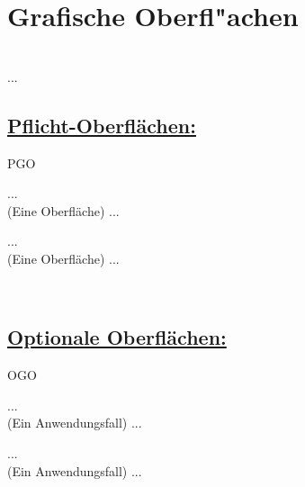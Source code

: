 %
%


%
%
\clearpage


\section{Grafische Oberfl{"a}chen}
\label{NU:GO}~\\

...
\\


\subsection*{\underline{Pflicht-Oberflächen:}}

\begin{ids}{\gls{PGO}}

	\id[ 1] ... \hfill\\
	
	(Eine Oberfläche) ...
	
	\id[10] ... \hfill\\
	
	(Eine Oberfläche) ...

\end{ids}


~\\


\subsection*{\underline{Optionale Oberflächen:}}

\begin{ids}{\gls{OGO}}

	\id[ 1] ... \hfill\\
	
	(Ein Anwendungsfall) ...
	
	\id[10] ... \hfill\\
	
	(Ein Anwendungsfall) ...

\end{ids}


